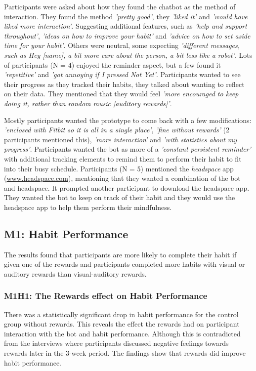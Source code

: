 Participants were asked about how they found the chatbot as the method of interaction. They found the method \textit{'pretty good'}, they \textit{'liked it'} and \textit{'would have liked more interaction'}. Suggesting additional features, such as \textit{'help and support throughout'}, \textit{'ideas on how to improve your habit'} and \textit{'advice on how to set aside time for your habit'}. Others were neutral, some expecting \textit{'different messages, such as Hey [name], a bit more care about the person, a bit less like a robot'}. Lots of participants (N = 4) enjoyed the reminder aspect, but a few found it \textit{'repetitive'} and \textit{'got annoying if I pressed Not Yet'}. Participants wanted to see their progress as they tracked their habits, they talked about wanting to reflect on their data. They mentioned that they would feel \textit{'more encouraged to keep doing it, rather than random music [auditory rewards]'}.


Mostly participants wanted the prototype to come back with a few modifications: \textit{'enclosed with Fitbit so it is all in a single place'}, \textit{'fine without rewards'} (2 participants mentioned this), \textit{'more interaction'} and \textit{'with statistics about my progress'}. Participants wanted the bot as more of a \textit{'constant persistent reminder'} with additional tracking elements to remind them to perform their habit to fit into their busy schedule. Participants (N = 5) mentioned the \textit{headspace} app (\url{www.headspace.com}), mentioning that they wanted a combination of the bot and headspace. It prompted another participant to download the headspace app. They wanted the bot to keep on track of their habit and they would use the headspace app to help them perform their mindfulness.

\subsection*{M1: Habit Performance}
The results found that participants are more likely to complete their habit if given one of the rewards and participants completed more habits with visual or auditory rewards than visual-auditory rewards.

\subsubsection*{M1H1: The Rewards effect on Habit Performance}
There was a statistically significant drop in habit performance for the control group without rewards. This reveals the effect the rewards had on participant interaction with the bot and habit performance. Although this is contradicted from the interviews where participants discussed negative feelings towards rewards later in the 3-week period. The findings show that rewards did improve habit performance.

